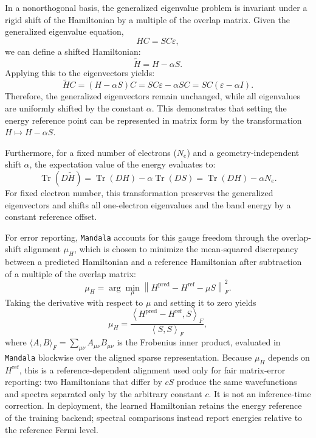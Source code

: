 \documentclass[preprint,12pt,compress,numafflabel]{elsarticle}
\begin{document}
In a nonorthogonal basis, the generalized eigenvalue problem is invariant under a rigid shift of the Hamiltonian by a multiple of the overlap matrix. Given the generalized eigenvalue equation,
\begin{equation}
H C = S C \varepsilon,
\end{equation}
we can define a shifted Hamiltonian:
\begin{equation}
\widetilde{H} = H - \alpha S.
\end{equation}
Applying this to the eigenvectors yields:
\begin{equation}
\widetilde{H} C = (H-\alpha S) C = S C \varepsilon - \alpha S C = S C (\varepsilon - \alpha I).
\end{equation}
Therefore, the generalized eigenvectors remain unchanged, while all eigenvalues are uniformly shifted by the constant $\alpha$. This demonstrates that setting the energy reference point can be represented in matrix form by the transformation $H \mapsto H - \alpha S$.

Furthermore, for a fixed number of electrons ($N_e$) and a geometry-independent shift $\alpha$, the expectation value of the energy evaluates to:
\begin{equation}
\operatorname{Tr}(D\widetilde{H}) = \operatorname{Tr}(DH) - \alpha \operatorname{Tr}(DS) = \operatorname{Tr}(DH) - \alpha N_e.
\end{equation}
For fixed electron number, this transformation preserves the generalized eigenvectors and shifts all one-electron eigenvalues and the band energy by a constant reference offset.

For error reporting, \texttt{Mandala} accounts for this gauge freedom through the overlap-shift alignment $\mu_H$, which is chosen to minimize the mean-squared discrepancy between a predicted Hamiltonian and a reference Hamiltonian after subtraction of a multiple of the overlap matrix:
\begin{equation}
\mu_H
=
\arg\min_{\mu}
\left\|
H^{\mathrm{pred}} - H^{\mathrm{ref}} - \mu S
\right\|_F^2.
\end{equation}
Taking the derivative with respect to $\mu$ and setting it to zero yields
\begin{equation}
\mu_H
=
\frac{
\left\langle
H^{\mathrm{pred}} - H^{\mathrm{ref}}, S
\right\rangle_F
}{
\left\langle S, S \right\rangle_F
},
\end{equation}
where $\langle A,B\rangle_F = \sum_{\mu \nu} A_{\mu \nu} B_{\mu \nu}$ is the Frobenius inner product, evaluated in \texttt{Mandala} blockwise over the aligned sparse representation. Because $\mu_H$ depends on $H^{\mathrm{ref}}$, this is a reference-dependent alignment used only for fair matrix-error reporting: two Hamiltonians that differ by $cS$ produce the same wavefunctions and spectra separated only by the arbitrary constant $c$. It is not an inference-time correction. In deployment, the learned Hamiltonian retains the energy reference of the training backend; spectral comparisons instead report energies relative to the reference Fermi level.
\end{document}
